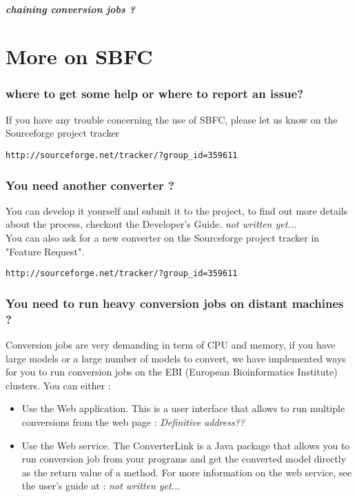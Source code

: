 \documentclass{article}
\begin{document}
		\subsubsection{chaining conversion jobs ?}

\part{More on SBFC}
\section{where to get some help or where to report an issue?}
If you have any trouble concerning the use of SBFC, please let us know on the Sourceforge project tracker 
\begin{lstlisting}
http://sourceforge.net/tracker/?group_id=359611
\end{lstlisting}
\section{You need another converter ?}
You can develop it yourself and submit it to the project, to find out more details about the process, checkout the Developer's Guide. {\it not written yet...}\\
You can also ask for a new converter on the Sourceforge project tracker in "Feature Request".
\begin{lstlisting}
http://sourceforge.net/tracker/?group_id=359611
\end{lstlisting}
\section{You need to run heavy conversion jobs on distant machines ?}
Conversion jobs are very demanding in term of CPU and memory, if you have large models or a large number of models to convert, we have implemented ways for you to run conversion jobs on the EBI (European Bioinformatics Institute) clusters. You can either :
\begin{itemize}
\item Use the Web application. This is a user interface that allows to run multiple conversions from the web page : {\it Definitive address??}
\item Use the Web service. The ConverterLink is a Java package that allows you to run conversion job from your programs and get the converted model directly as the return value of a method. For more information on the web service, see the user's guide at : {\it not written yet...}
\end{itemize}
\end{document}
